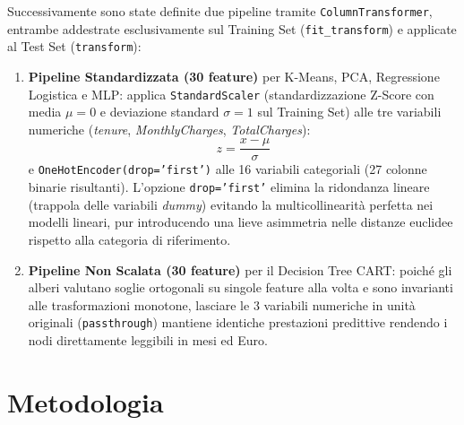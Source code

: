\documentclass[11pt,a4paper]{article}
\begin{document}
Successivamente sono state definite due pipeline tramite \texttt{ColumnTransformer}, entrambe addestrate esclusivamente sul Training Set (\texttt{fit\_transform}) e applicate al Test Set (\texttt{transform}):
\begin{enumerate}
    \item \textbf{Pipeline Standardizzata (30 feature)} per K-Means, PCA, Regressione Logistica e MLP: applica \texttt{StandardScaler} (standardizzazione Z-Score con media $\mu=0$ e deviazione standard $\sigma=1$ sul Training Set) alle tre variabili numeriche (\textit{tenure}, \textit{MonthlyCharges}, \textit{TotalCharges}):
    \begin{equation}
        z = \frac{x - \mu}{\sigma}
    \end{equation}
    e \texttt{OneHotEncoder(drop='first')} alle 16 variabili categoriali (27 colonne binarie risultanti). L'opzione \texttt{drop='first'} elimina la ridondanza lineare (trappola delle variabili \textit{dummy}) evitando la multicollinearità perfetta nei modelli lineari, pur introducendo una lieve asimmetria nelle distanze euclidee rispetto alla categoria di riferimento.
    \item \textbf{Pipeline Non Scalata (30 feature)} per il Decision Tree CART: poiché gli alberi valutano soglie ortogonali su singole feature alla volta e sono invarianti alle trasformazioni monotone, lasciare le 3 variabili numeriche in unità originali (\texttt{passthrough}) mantiene identiche prestazioni predittive rendendo i nodi direttamente leggibili in mesi ed Euro.
\end{enumerate}

\section{Metodologia}
\end{document}
